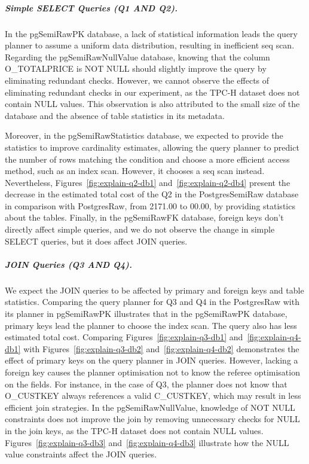 \subparagraph{Simple SELECT Queries (Q1 AND Q2).}
In the pgSemiRawPK database, a lack of statistical information leads the query planner to assume a uniform data distribution, resulting in inefficient \acrshort{seq scan}. Regarding the pgSemiRawNullValue database, knowing that the column O\_TOTALPRICE is NOT NULL should slightly improve the query by eliminating redundant checks. However, we cannot observe the effects of eliminating redundant checks in our experiment, as the TPC-H dataset does not contain NULL values. This observation is also attributed to the small size of the database and the absence of table statistics in its metadata.

Moreover, in the pgSemiRawStatistics database, we expected to provide the statistics to improve cardinality estimates, allowing the query planner to predict the number of rows matching the condition and choose a more efficient access method, such as an index scan. However, it chooses a \acrshort{seq scan} instead. Nevertheless, Figures~\ref{fig:explain-q2-db1} and~\ref{fig:explain-q2-db4} present the decrease in the estimated total cost of the Q2 in the PostgresSemiRaw database in comparison with PostgresRaw, from 2171.00 to 00.00, by providing statistics about the tables. Finally, in the pgSemiRawFK database, foreign keys don't directly affect simple queries, and we do not observe the change in simple SELECT queries, but it does affect JOIN queries.




\subparagraph{JOIN Queries (Q3 AND Q4).}
We expect the JOIN queries to be affected by primary and foreign keys and table statistics. Comparing the query planner for Q3 and Q4 in the PostgresRaw with its planner in pgSemiRawPK illustrates that in the pgSemiRawPK database, primary keys lead the planner to choose the index scan. The query also has less estimated total cost. Comparing Figures~\ref{fig:explain-q3-db1} and~\ref{fig:explain-q4-db1} with Figures~\ref{fig:explain-q3-db2} and~\ref{fig:explain-q4-db2} demonstrates the effect of primary keys on the query planner in JOIN queries. However, lacking a foreign key causes the planner optimisation not to know the referee optimisation on the fields. For instance, in the case of Q3, the planner does not know that O\_CUSTKEY always references a valid C\_CUSTKEY, which may result in less efficient join strategies. In the pgSemiRawNullValue, knowledge of NOT NULL constraints does not improve the join by removing unnecessary checks for NULL in the join keys, as the TPC-H dataset does not contain NULL values. Figures~\ref{fig:explain-q3-db3} and~\ref{fig:explain-q4-db3} illustrate how the NULL value constraints affect the JOIN queries.

